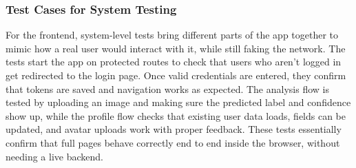 \subsubsection{Test Cases for System Testing}
For the frontend, system-level tests bring different parts of the app together
to mimic how a real user would interact with it, while still faking the
network. The tests start the app on protected routes to check that users who
aren’t logged in get redirected to the login page. Once valid credentials are
entered, they confirm that tokens are saved and navigation works as expected.
The analysis flow is tested by uploading an image and making sure the predicted
label and confidence show up, while the profile flow checks that existing user
data loads, fields can be updated, and avatar uploads work with proper
feedback. These tests essentially confirm that full pages behave correctly end
to end inside the browser, without needing a live backend.

